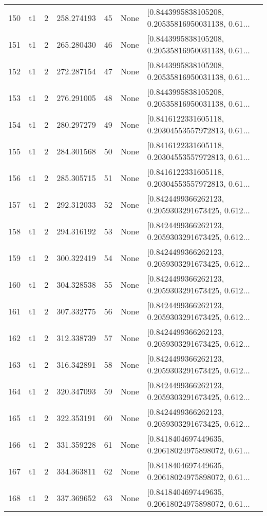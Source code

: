 \begin{tabular}{lllrlll}
150 &  t1 &   2 &  258.274193 &   45 &  None &  [0.8443995838105208, 0.20535816950031138, 0.61... \\
151 &  t1 &   2 &  265.280430 &   46 &  None &  [0.8443995838105208, 0.20535816950031138, 0.61... \\
152 &  t1 &   2 &  272.287154 &   47 &  None &  [0.8443995838105208, 0.20535816950031138, 0.61... \\
153 &  t1 &   2 &  276.291005 &   48 &  None &  [0.8443995838105208, 0.20535816950031138, 0.61... \\
154 &  t1 &   2 &  280.297279 &   49 &  None &  [0.8416122331605118, 0.20304553557972813, 0.61... \\
155 &  t1 &   2 &  284.301568 &   50 &  None &  [0.8416122331605118, 0.20304553557972813, 0.61... \\
156 &  t1 &   2 &  285.305715 &   51 &  None &  [0.8416122331605118, 0.20304553557972813, 0.61... \\
157 &  t1 &   2 &  292.312033 &   52 &  None &  [0.8424499366262123, 0.2059303291673425, 0.612... \\
158 &  t1 &   2 &  294.316192 &   53 &  None &  [0.8424499366262123, 0.2059303291673425, 0.612... \\
159 &  t1 &   2 &  300.322419 &   54 &  None &  [0.8424499366262123, 0.2059303291673425, 0.612... \\
160 &  t1 &   2 &  304.328538 &   55 &  None &  [0.8424499366262123, 0.2059303291673425, 0.612... \\
161 &  t1 &   2 &  307.332775 &   56 &  None &  [0.8424499366262123, 0.2059303291673425, 0.612... \\
162 &  t1 &   2 &  312.338739 &   57 &  None &  [0.8424499366262123, 0.2059303291673425, 0.612... \\
163 &  t1 &   2 &  316.342891 &   58 &  None &  [0.8424499366262123, 0.2059303291673425, 0.612... \\
164 &  t1 &   2 &  320.347093 &   59 &  None &  [0.8424499366262123, 0.2059303291673425, 0.612... \\
165 &  t1 &   2 &  322.353191 &   60 &  None &  [0.8424499366262123, 0.2059303291673425, 0.612... \\
166 &  t1 &   2 &  331.359228 &   61 &  None &  [0.8418404697449635, 0.20618024975898072, 0.61... \\
167 &  t1 &   2 &  334.363811 &   62 &  None &  [0.8418404697449635, 0.20618024975898072, 0.61... \\
168 &  t1 &   2 &  337.369652 &   63 &  None &  [0.8418404697449635, 0.20618024975898072, 0.61... \\

\end{tabular}
